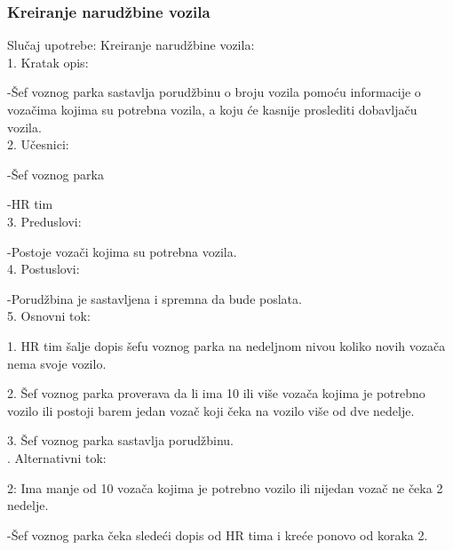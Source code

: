 \subsubsection{\bfseries Kreiranje narudžbine vozila}
\noindent Slučaj upotrebe: Kreiranje narudžbine vozila:\\
1. Kratak opis:
\par -Šef voznog parka sastavlja porudžbinu o broju vozila pomoću informacije o vozačima kojima su potrebna vozila, a koju će kasnije proslediti dobavljaču vozila.\\
2. Učesnici:
\par -Šef voznog parka
\par -HR tim\\
3. Preduslovi:
\par -Postoje vozači kojima su potrebna vozila.\\
4. Postuslovi:
\par -Porudžbina je sastavljena i spremna da bude poslata.\\
5. Osnovni tok:
\par 1. HR tim šalje dopis šefu voznog parka na nedeljnom nivou koliko novih vozača nema svoje vozilo.
\par 2. Šef voznog parka proverava da li ima 10 ili više vozača kojima je potrebno vozilo ili postoji barem jedan vozač koji čeka na vozilo više od dve nedelje.
\par 3. Šef voznog parka sastavlja porudžbinu.\\

. Alternativni tok:
\par 2: Ima manje od 10 vozača kojima je potrebno vozilo ili nijedan vozač ne čeka 2 nedelje.
\par -Šef voznog parka čeka sledeći dopis od HR tima i kreće ponovo od koraka 2.

